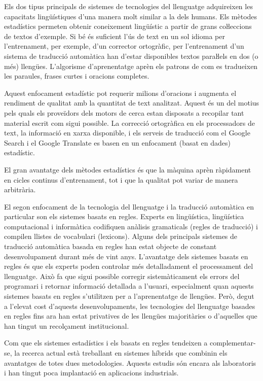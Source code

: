 \documentclass[]{../../metanetpaper}
\begin{document}
\begin{multicols}{2}
Els dos tipus principals de sistemes de tecnologies del llenguatge adquireixen les capacitats lingüístiques d’una manera molt similar a la dels humans. Els mètodes estadístics permeten obtenir coneixement lingüístic a partir de grans coŀleccions de textos d’exemple. Si bé és suficient l'ús de text en un sol idioma per l’entrenament, per exemple, d'un corrector ortogràfic, per l’entrenament d'un sistema de traducció automàtica han d'estar disponibles textos paraŀlels en dos (o més) llengües. L'algorisme d'aprenentatge aprèn els patrons de com es tradueixen les paraules, frases curtes i oracions completes.

Aquest enfocament estadístic pot requerir milions d'oracions i augmenta el rendiment de qualitat amb la quantitat de text analitzat. Aquest és un del motius pels quals els proveïdors dels motors de cerca estan disposats a recopilar tant material escrit com sigui possible. La correcció ortogràfica en els processadors de text, la informació en xarxa disponible, i els serveis de traducció com el Google Search i el Google Translate es basen en un enfocament (basat en dades) estadístic.   

El gran avantatge dels mètodes estadístics és que la màquina aprèn ràpidament en cicles continus d’entrenament, tot i que la qualitat pot variar de manera arbitrària.

El segon enfocament de la tecnologia del llenguatge i la traducció automàtica en particular son els sistemes basats en regles. Experts en lingüística, lingüística computacional i informàtica codifiquen anàlisis gramaticals (regles de traducció) i compilen llistes de vocabulari (lexicons). Alguns dels principals sistemes de traducció automàtica basada en regles han estat objecte de constant desenvolupament durant més de vint anys. L’avantatge dels sistemes basats en regles és que els experts poden controlar més detalladament el processament del llenguatge. Això fa que sigui possible corregir sistemàticament els errors del programari i retornar informació detallada a l’usuari, especialment quan aquests sistemes basats en regles s’utilitzen per a l’aprenentatge de llengües. Però, degut a l'elevat cost d'aquests desenvolupaments, les tecnologies del llenguatge basades en regles fins ara han estat privatives de les llengües majoritàries o d'aquelles que han tingut un recolçament institucional.

	Com que els sistemes estadístics i els basats en regles tendeixen a complementar-se, la recerca actual està treballant en sistemes híbrids que combinin els avantatges de totes dues metodologies. Aquests estudis són encara als laboratoris i han tingut poca implantació en aplicacions industrials.
	

\end{multicols}
\end{document}
